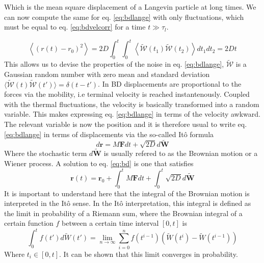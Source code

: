 \documentclass[ twoside,openright,titlepage,numbers=noenddot,%
headinclude,footinclude,cleardoublepage=empty,abstract=on,
BCOR=5mm,paper=a4,fontsize=11pt, dvipsnames
]{scrreprt}
\renewcommand{\vec}[1]{\bm{#1}}
\newcommand{\noise}{\widetilde{W}}
\begin{document}
Which is the mean square displacement of a Langevin particle at long times.
We can now compute the same for eq. \eqref{eq:bdlange} with only fluctuations, which must be equal to eq. \eqref{eq:bdvelcorr} for a time $t \gg \tau_l$.

\begin{equation}
  \label{eq:bdmsd}
  \left\langle (r(t)-r_0)^2 \right\rangle = 2D\int_0^{t}{\int_0^{t}{\left\langle\mathcal{\noise}(t_1)\mathcal{\noise}(t_2)\right\rangle dt_1dt_2}} = 2Dt
\end{equation}
This allows us to devise the properties of the noise in eq. \eqref{eq:bdlange}, $\mathcal{\noise}$ is a Gaussian random number with zero mean and standard deviation $\langle\mathcal{\noise}(t)\mathcal{\noise}(t')\rangle = \delta(t-t')$.
In \gls{BD} displacements are proportional to the forces via the mobility, i.e terminal velocity is reached instantenously.
Coupled with the thermal fluctuations, the velocity is basically transformed into a random variable. This makes expressing eq. \eqref{eq:bdlange} in terms of the velocity awkward. The relevant variable is now the position and it is therefore usual to write eq. \eqref{eq:bdlange} in terms of displacements via the so-called Itô formula
\begin{equation}
  \label{eq:bd}
  d\vec{r} = M\vec{F}dt + \sqrt{2D}d\vec{\noise}
\end{equation}
Where the stochastic term $d\vec{\noise}$ is usually refered to as the Brownian motion or a Wiener process.
A solution to eq. \eqref{eq:bd} is one that satisfies
\begin{equation}
  \label{eq:bddis}
  \vec{r}(t) = \vec{r}_0 + \int_0^tM\vec{F}dt + \int_0^t\sqrt{2D}d\vec{\noise}
\end{equation}
It is important to understand here that the integral of the Brownian motion is interpreted in the Itô sense.
In the Itô interpretation, this integral is defined as the limit in probability of a Riemann sum, where the Brownian integral of a certain function $f$ between a certain time interval $[0, t]$ is
\begin{equation}
  \label{eq:itonoise}
  \int_0^tf(t')d\noise(t') = \lim_{n\rightarrow\infty}\sum_{i=0}^nf(t^{i-1}) (\noise(t^i) - \noise({t^{i-1}}))
\end{equation}
Where $t_i\in [0, t]$.
It can be shown that this limit converges in probability\cite{itoconvergence}.
\end{document}
